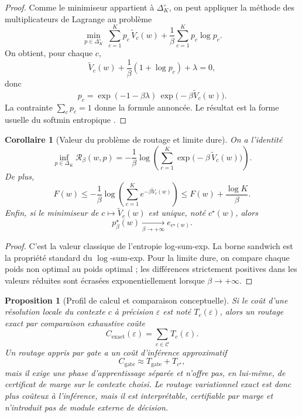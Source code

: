 \documentclass[11pt,a4paper]{article}
\newtheorem{proposition}{Proposition}[section]
\newtheorem{corollary}{Corollaire}[section]
\newcommand{\Ccal}{\mathcal C}
\newcommand{\Rcal}{\mathcal R}
\begin{document}
\begin{proof}
Comme le minimiseur appartient à \(\Delta_K^\circ\), on peut appliquer la méthode des multiplicateurs de Lagrange au problème
\[
\min_{p\in\Delta_K^\circ}\ \sum_{c=1}^K p_c\,\widetilde V_c(w)+\frac{1}{\beta}\sum_{c=1}^K p_c\log p_c.
\]
On obtient, pour chaque \(c\),
\[
\widetilde V_c(w)+\frac{1}{\beta}(1+\log p_c)+\lambda=0,
\]
donc
\[
 p_c=\exp(-1-\beta\lambda)\,\exp\!\bigl(-\beta\widetilde V_c(w)\bigr).
\]
La contrainte \(\sum_c p_c=1\) donne la formule annoncée. Le résultat est la forme usuelle du softmin entropique \cite{BauschkeCombettes2017,RockafellarWets1998}.
\end{proof}

\begin{corollary}[Valeur du problème de routage et limite dure]
On a l'identité
\[
\inf_{p\in\Delta_K}\Rcal_\beta(w,p)
=
-\frac{1}{\beta}\log\!\left(\sum_{c=1}^K \exp\!\bigl(-\beta\,\widetilde V_c(w)\bigr)\right).
\]
De plus,
\[
F(w)\le -\frac{1}{\beta}\log\!\left(\sum_{c=1}^K e^{-\beta \widetilde V_c(w)}\right)\le F(w)+\frac{\log K}{\beta}.
\]
Enfin, si le minimiseur de \(c\mapsto \widetilde V_c(w)\) est unique, noté \(c^\star(w)\), alors
\[
 p^\star_\beta(w)\xrightarrow[\beta\to+\infty]{}e_{c^\star(w)}.
\]
\end{corollary}

\begin{proof}
C'est la valeur classique de l'entropie log-sum-exp. La borne sandwich est la propriété standard du \(\log\)-sum-exp. Pour la limite dure, on compare chaque poids non optimal au poids optimal ; les différences strictement positives dans les valeurs réduites sont écrasées exponentiellement lorsque \(\beta\to+\infty\).
\end{proof}

\begin{proposition}[Profil de calcul et comparaison conceptuelle]
Si le coût d'une résolution locale du contexte \(c\) à précision \(\varepsilon\) est noté \(T_c(\varepsilon)\), alors un routage exact par comparaison exhaustive coûte
\[
C_{\mathrm{exact}}(\varepsilon)=\sum_{c\in\Ccal}T_c(\varepsilon).
\]
Un routage appris par gate a un coût d'inférence approximatif
\[
C_{\mathrm{gate}}\approx T_{\mathrm{gate}}+T_{c^\star},
\]
mais il exige une phase d'apprentissage séparée et n'offre pas, en lui-même, de certificat de marge sur le contexte choisi. Le routage variationnel exact est donc plus coûteux à l'inférence, mais il est interprétable, certifiable par marge et n'introduit pas de module externe de décision.
\end{proposition}
\end{document}
